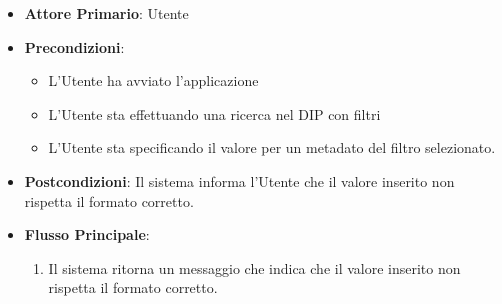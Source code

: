 \begin{itemize}
      \item \textbf{Attore Primario}: Utente
      \item \textbf{Precondizioni}: \begin{itemize}
            \item L'Utente ha avviato l'applicazione
            \item L'Utente sta effettuando una ricerca nel DIP con filtri
            \item L'Utente sta specificando il valore per un metadato del filtro selezionato.
      \end{itemize}
      \item \textbf{Postcondizioni}: Il sistema informa l'Utente che il valore inserito non rispetta il formato corretto.
      \item \textbf{Flusso Principale}:
      \begin{enumerate}
            \item Il sistema ritorna un messaggio che indica che il valore inserito non rispetta il formato corretto.
      \end{enumerate}
\end{itemize}